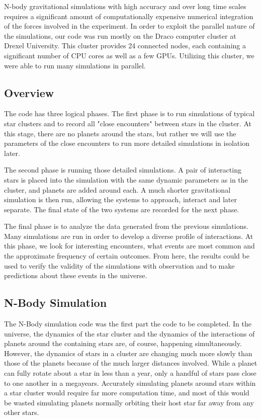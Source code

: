 \documentclass[12pt]{article}
\begin{document}
    N-body gravitational simulations with high accuracy and over long time scales requires
    a significant amount of computationally expensive numerical integration of the 
    forces involved in the experiment. In order to exploit the parallel nature of 
    the simulations, our code was run mostly on the Draco computer 
    cluster at Drexel University. This cluster provides 24 connected nodes, each containing
    a significant number of CPU cores as well as a few GPUs. Utilizing this cluster,
    we were able to run many simulations in parallel.

    \subsection{Overview}

    The code has three logical phases. The first phase is to run simulations of typical
    star clusters and to record all "close encounters" between stars in the cluster.
    At this stage, there are no planets around the stars, but rather we will use the
    parameters of the close encounters to run more detailed simulations in isolation
    later.

    The second phase is running those detailed simulations. A pair of interacting stars
    is placed into the simulation with the same dynamic parameters as in the cluster,
    and planets are added around each. A much shorter gravitational simulation is then
    run, allowing the systems to approach, interact and later separate. The final
    state of the two systems are recorded for the next phase.

    The final phase is to analyze the data generated from the previous simulations.
    Many simulations are run in order to develop a diverse profile of interactions.
    At this phase, we look for interesting encounters, what events are most common
    and the approximate frequency of certain outcomes. From here, the results could
    be used to verify the validity of the simulations with observation and to make
    predictions about these events in the universe.


    \subsection{N-Body Simulation}

    The N-Body simulation code was the first part the code to be completed. In the
    universe, the dynamics of the star cluster and the dynamics of the
    interactions of planets around the containing stars are, of course, happening
    simultaneously. However, the dynamics of stars in a cluster are changing much
    more slowly than those of the planets because of the much larger distances
    involved. While a planet can fully rotate about a star in less than a year,
    only a handful of stars pass close to one another in a megayears. Accurately
    simulating planets around stars within a star cluster would require
    far more computation time, and most of this would be wasted simulating
    planets normally orbiting their host star far away from any other stars.
\end{document}
